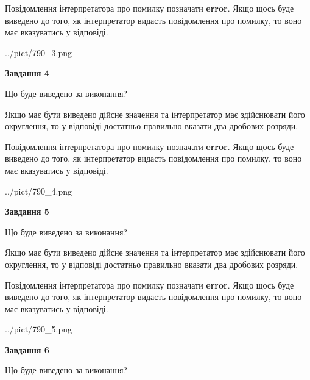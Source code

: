 \documentclass[12pt, ukrainian]{article}
\begin{document}
{\begin {Large}
Повідомлення інтерпретатора про помилку позначати \textbf{error}.
Якщо щось буде виведено до того, як інтерпретатор видасть повідомлення про помилку, 
то воно має вказуватись у відповіді. \par

\begin{center}
	{../pict/790_3.png}
\end{center}
\newpage

{\begin {center}\textbf{Завдання 4}\end {center}}\par
Що буде виведено за виконання? \par

Якщо має бути виведено дійсне значення та інтерпретатор має здійснювати його округлення, 
то у відповіді достатньо правильно вказати два дробових розряди.

Повідомлення інтерпретатора про помилку позначати \textbf{error}.
Якщо щось буде виведено до того, як інтерпретатор видасть повідомлення про помилку, 
то воно має вказуватись у відповіді. \par

\begin{center}
	{../pict/790_4.png}
\end{center}
\newpage

{\begin {center}\textbf{Завдання 5}\end {center}}\par
Що буде виведено за виконання? \par

Якщо має бути виведено дійсне значення та інтерпретатор має здійснювати його округлення, 
то у відповіді достатньо правильно вказати два дробових розряди.

Повідомлення інтерпретатора про помилку позначати \textbf{error}.
Якщо щось буде виведено до того, як інтерпретатор видасть повідомлення про помилку, 
то воно має вказуватись у відповіді. \par

\begin{center}
	{../pict/790_5.png}
\end{center}
\newpage

{\begin {center}\textbf{Завдання 6}\end {center}}\par
Що буде виведено за виконання? \par


\end{Large}}
\end{document}

